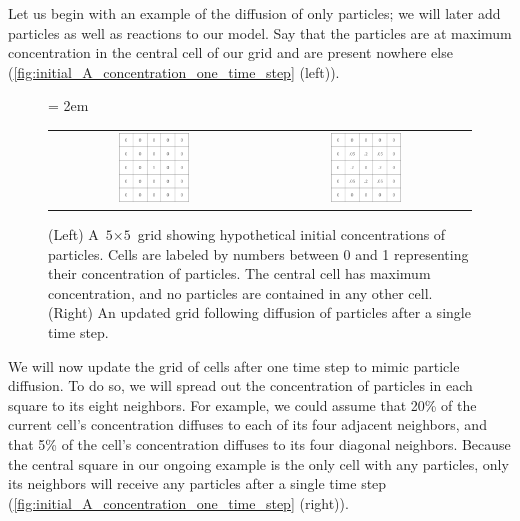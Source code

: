 Let us begin with an example of the diffusion of only  particles; we will later add  particles as well as reactions to our model. Say that the particles are at maximum concentration in the central cell of our grid and are present nowhere else (\autoref{fig:initial_A_concentration_one_time_step} (left)).

\begin{figure}[h]
\centering
\mySfFamily
\tabcolsep = 2em
\begin{tabular}{c c}
\includegraphics[width = 0.35\textwidth]{../images/initial_A_concentration.png} & \includegraphics[width = 0.35\textwidth]{../images/A_concentration_one_time_step.png}
\end{tabular}
\caption{(Left) A $\text{5} \times \text{5}$ grid showing hypothetical initial concentrations of  particles. Cells are labeled by numbers between 0 and 1 representing their concentration of  particles. The central cell has maximum concentration, and no particles are contained in any other cell. (Right) An updated grid following diffusion of particles after a single time step.}
\label{fig:initial_A_concentration_one_time_step}
\end{figure}

We will now update the grid of cells after one time step to mimic particle diffusion. To do so, we will spread out the concentration of particles in each square to its eight neighbors. For example, we could assume that 20\% of the current cell's concentration diffuses to each of its four adjacent neighbors, and that 5\% of the cell's concentration diffuses to its four diagonal neighbors. Because the central square in our ongoing example is the only cell with any particles, only its neighbors will receive any particles after a single time step (\autoref{fig:initial_A_concentration_one_time_step} (right)).\\


